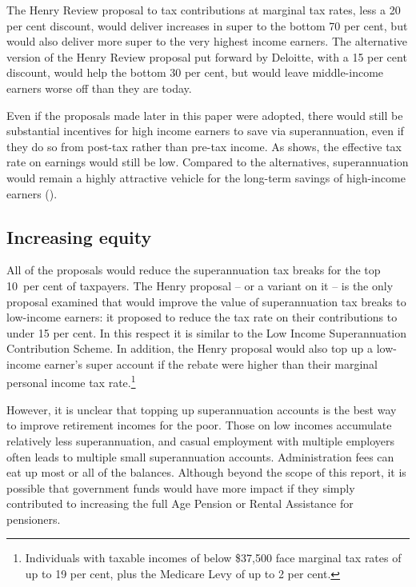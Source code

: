The Henry Review proposal to tax contributions at marginal tax rates, less a 20 per cent discount, would deliver increases in super to the bottom 70 per cent, but would also deliver more super to the very highest income earners. The alternative version of the Henry Review proposal put forward by Deloitte, with a 15 per cent discount, would help the bottom 30 per cent, but would leave middle-income earners worse off than they are today. 

Even if the proposals made later in this paper were adopted, there would still be substantial incentives for high income earners to save via superannuation, even if they do so from post-tax rather than pre-tax income. As  shows, the effective tax rate on earnings would still be low. Compared to the alternatives, superannuation would remain a highly attractive vehicle for the long-term savings of high-income earners ().%
\enlargethispage*{0.5\baselineskip}\enlargethispage{0.5\baselineskip}

\subsection{Increasing equity}
All of the proposals would reduce the superannuation tax breaks for the top 10~per cent of taxpayers. The Henry proposal – or a variant on it – is the only proposal examined that would improve the value of superannuation tax breaks to low-income earners: it proposed to reduce the tax rate on their contributions to under 15 per cent. In this respect it is similar to the Low Income Superannuation Contribution Scheme. In addition, the Henry proposal would also top up a low-income earner’s super account if the rebate were higher than their marginal personal income tax rate.\footnote{Individuals with taxable incomes of below \$37,500 face marginal tax rates of up to 19 per cent, plus the Medicare Levy of up to 2 per cent.}\

However, it is unclear that topping up superannuation accounts is the best way to improve retirement incomes for the poor. Those on low incomes accumulate relatively less superannuation, and casual employment with multiple employers often leads to multiple small superannuation accounts. Administration fees can eat up most or all of the balances. Although beyond the scope of this report, it is possible that government funds would have more impact if they simply contributed to increasing the full Age Pension or Rental Assistance for pensioners.

